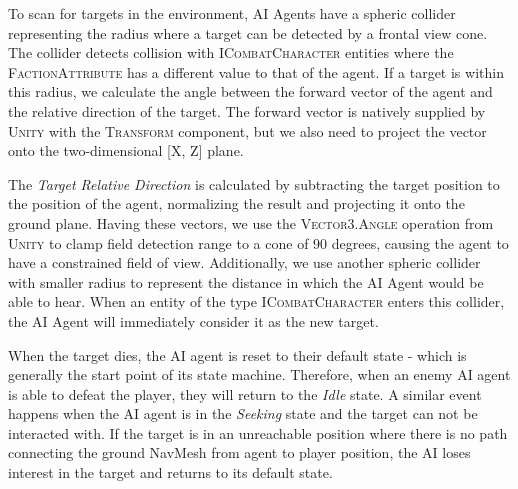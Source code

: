 To scan for targets in the environment, AI Agents have a spheric collider representing the radius where a target can be detected by a frontal view cone. The collider detects collision with \textsc{ICombatCharacter} entities where the \textsc{FactionAttribute} has a different value to that of the agent. If a target is within this radius, we calculate the angle between the forward vector of the agent and the relative direction of the target. The forward vector is natively supplied by \textsc{Unity} with the \textsc{Transform} component, but we also need to project the vector onto the two-dimensional [X, Z] plane.

The \emph{Target Relative Direction} is calculated by subtracting the target position to the position of the agent, normalizing the result and projecting it onto the ground plane. Having these vectors, we use the \textsc{Vector3.Angle} operation from \textsc{Unity} to clamp field detection range to a cone of 90 degrees, causing the agent to have a constrained field of view. Additionally, we use another spheric collider with smaller radius to represent the distance in which the AI Agent would be able to hear. When an entity of the type \textsc{ICombatCharacter} enters this collider, the AI Agent will immediately consider it as the new target.

When the target dies, the AI agent is reset to their default state - which is generally the start point of its state machine. Therefore, when an enemy AI agent is able to defeat the player, they will return to the \emph{Idle} state. A similar event happens when the AI agent is in the \emph{Seeking} state and the target can not be interacted with. If the target is in an unreachable position where there is no path connecting the ground NavMesh from agent to player position, the AI loses interest in the target and returns to its default state.

